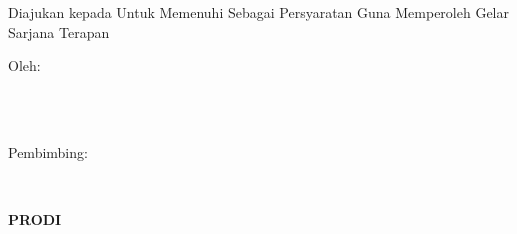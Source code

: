
\newpage
{}
\begin{center}
    \begin{doublespace}
        \textbf{\large{\MakeUppercase{\judulid}}}\\[2.5cm]
    \end{doublespace}

    \textbf{\MakeUppercase{\large{\tipe}}}\\[0.5cm]
    \begin{onehalfspace}
        Diajukan kepada {\fakultas} {\universitas} Untuk Memenuhi Sebagai Persyaratan Guna Memperoleh Gelar Sarjana Terapan\\[1.8cm]
    \end{onehalfspace}

    \large Oleh: \\
    \begin{onehalfspace}
        \large{\penulis} \\
        \large{\nim}\\[1.5cm]
    \end{onehalfspace}
    \vspace{1.5cm}

    \large Pembimbing: \\
    \begin{onehalfspace}
        \large{\pembimbing} \\
    \end{onehalfspace}

    \vfill

    \textbf{\large \MakeUppercase{Prodi \prodi}}\\
    \textbf{\large \MakeUppercase{\fakultas}}\\
    \textbf{\large \MakeUppercase{\universitas}}\\
    \textbf{\large \the\year{}}\\
\end{center}
